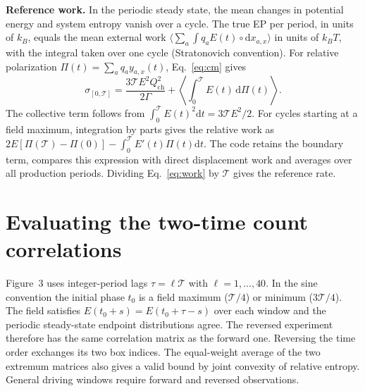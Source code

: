 \documentclass[11pt,letterpaper]{article}
\newcommand{\Tr}{\mathcal T}
\newcommand{\ch}{Q_{\mathrm{ch}}}
\newcommand{\dd}{\mathrm d}
\begin{document}
\textbf{Reference work.}
In the periodic steady state, the mean changes in potential energy and system entropy vanish
over a cycle. The true EP per period, in units of $k_B$, equals the mean external work
$\langle\sum_a\int q_a E(t)\circ\dd x_{a,x}\rangle$ in units of $k_BT$, with the integral
taken over one cycle (Stratonovich convention). For relative polarization
$\Pi(t)=\sum_a q_a y_{a,x}(t)$, Eq.~\eqref{eq:cm} gives
\begin{equation}
 \sigma_{[0,\Tr]}=\frac{3\Tr E^2\ch^2}{2\Gamma}
   +\left\langle\int_0^\Tr E(t)\,\dd\Pi(t)\right\rangle .
 \label{eq:work}
\end{equation}
The collective term follows from $\int_0^\Tr E(t)^2\dd t=3\Tr E^2/2$. For cycles starting at
a field maximum, integration by parts gives the relative work as
$2E[\Pi(\Tr)-\Pi(0)]-\int_0^\Tr E'(t)\Pi(t)\dd t$. The code retains the boundary term,
compares this expression with direct displacement work and averages over all production periods.
Dividing Eq.~\eqref{eq:work} by $\Tr$ gives the reference rate.

\newpage
\section{Evaluating the two-time count correlations}
Figure~3 uses integer-period lags $\tau=\ell\Tr$ with $\ell=1,\ldots,40$. In the sine convention
the initial phase $t_0$ is a field maximum ($\Tr/4$) or minimum ($3\Tr/4$). The field satisfies
$E(t_0+s)=E(t_0+\tau-s)$ over each window and the periodic steady-state endpoint distributions
agree. The reversed experiment therefore has the same correlation matrix as the forward one.
Reversing the time order exchanges its two box indices. The equal-weight average of the two
extremum matrices also gives a valid bound by joint convexity of relative entropy. General
driving windows require forward and reversed observations.
\end{document}
